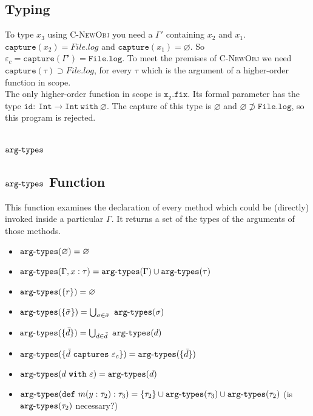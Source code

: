 \documentclass{llncs}
\newcommand{\keywadj}[1]{\mathtt{#1}}
\newcommand{\keyw}[1]{\keywadj{#1}~}
\newcommand{\kw}[1]{\keyw{ #1 }}
\newcommand{\kwa}[1]{\keywadj{ #1 }}
\newcommand{\hyphen}{\hbox{-}}
\begin{document}
\subsection{Typing}

To type $x_3$ using \textsc{C-NewObj} you need a $\Gamma'$ containing $x_2$ and $x_1$. $\kwa{capture}(x_2) = File.log$ and $\kwa{capture}(x_1) = \varnothing$. So $\varepsilon_c = \kwa{capture}(\Gamma') = \kwa{File.log}$. To meet the premises of \textsc{C-NewObj} we need $\kwa{capture}(\tau) \supset File.log$, for every $\tau$ which is the argument of a higher-order function in scope. \\

\noindent
The only higher-order function in scope is $\kwa{x_2.fix}$. Its formal parameter has the type $\kwa{id:~Int \rightarrow Int~with~\varnothing}$. The capture of this type is $\varnothing$ and $\varnothing \not\supset \kwa{File.log}$, so this program is rejected.

\section{$\kwa{arg \hyphen types}$}

\subsection{$\keywadj{arg \hyphen types}$ Function}

This function examines the declaration of every method which could be (directly) invoked inside a particular $\Gamma$. It returns a set of the types of the arguments of those methods.

\begin{itemize}
	\item $\kwa{arg \hyphen types}(\varnothing) = \varnothing$
	\item $\kwa{arg \hyphen types}(\Gamma, x : \tau) = \kwa{arg \hyphen types}(\Gamma) \cup \kwa{arg \hyphen types}(\tau)$
	\item $\kwa{arg \hyphen types}(\{r\}) = \varnothing$
	\item $\kwa{arg \hyphen types}(\{\bar \sigma\}) = \bigcup_{\sigma \in \bar \sigma}~\kwa{arg \hyphen types}(\sigma)$
	\item $\kwa{arg \hyphen types}(\{\bar d\}) = \bigcup_{d \in \bar d}~\kwa{arg \hyphen types}(d)$
	\item $\kwa{arg \hyphen types}(\{\bar d ~\keyw{captures} \varepsilon_c\}) =
 \kwa{arg \hyphen types}(\{ \bar d \})$
 	\item $\kwa{arg \hyphen types}(d ~\kw{with} \varepsilon) = \kwa{arg \hyphen types}(d)$
 	\item $\kwa{arg \hyphen types}(\kw{def} m(y: \tau_2): \tau_3) = \{ \tau_2 \} \cup \kwa{arg \hyphen types}(\tau_3) \cup \kwa{arg \hyphen types}(\tau_2)$ (is $\kwa{arg \hyphen types}(\tau_2)$ necessary?)
\end{itemize}
\end{document}
